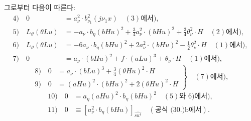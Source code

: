 
그로부터 다음이 따른다:
\begin{align*}
4)\quad 0&=a_\nu^2\cdot b_{\nu_1}^2(j\nu_1x)\quad(3)\text{에서}),\\
5)\quad L_\vartheta(\theta Lu)&=-a_\nu\cdot b_\eta(bHu)^2+\frac34a_\nu^2\cdot(bHu)^2+\frac34\theta_\nu^2\cdot H\quad(2)\text{에서}),\\
6)\quad L_\vartheta(\theta Lu)&=-6a_\nu\cdot b_\eta(bHu)^2+2a_\nu^2\cdot(bHu)^2-\frac12\theta_\nu^2\cdot H\quad(1)\text{에서}),\\
7)\quad 0&=a_\nu\cdot(bHu)^2+f\cdot(aLu)^3+\theta_\nu\cdot H\quad(1)\text{에서}),
\end{align*}
\[
\left.
\begin{aligned}
8)\quad 0&=a_\nu\cdot(bLu)^3+\frac34(\theta Hu)^2\cdot H\\
9)\quad 0&=(aHu)^2\cdot(bHu)^2+2(\theta Hu)^2\cdot H
\end{aligned}
\right\}\quad(7)\text{에서}),
\]
\begin{align*}
10)\quad 0&=a_\eta(aHu)^2\cdot b_\eta(bHu)^2\quad(5)\text{와 }6)\text{에서}),\\
11)\quad 0&\equiv [a_\nu^2\cdot b_\eta(bHu)]_{\widehat{su^4}}\quad(\text{공식 (30.)b에서}).
\end{align*}
